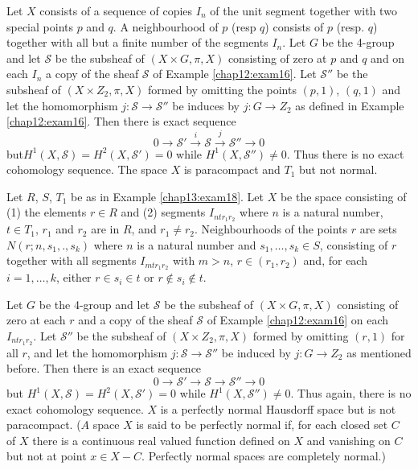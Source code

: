 \begin{exam}%
Let $X$ consists of a sequence of copies $I_n$ of the unit segment
together with two special points $p$ and $q$. A neighbourhood of
$p$ (resp $q$) consists of $p$ (resp. $q$) together with all but a
finite number of the segments $I_n$. Let $G$ be the 4-group and let
$\mathscr{S}$ be the subsheaf of $(X \times G, \pi, X)$ consisting  of
zero at $p$ and $q$ and on each $I_n$ a copy of the sheaf
$\mathscr{S}$ of Example \ref{chap12:exam16}. Let $\mathscr{S}''$ be
the subsheaf of 
$(X \times Z_2, \pi, X)$ formed by omitting the points $(p,1)$, $(q,1)$ and
let the homomorphism $j :  \mathscr{S} \to \mathscr{S}''$ be induces
by $j: G \to Z_2$ as defined in Example \ref{chap12:exam16}. Then
there is exact sequence 
$$
0 \to  \mathscr{S}' \xrightarrow{i} \mathscr{S} \xrightarrow{j} 
\mathscr{S}'' \to 0 
$$
but\pageoriginale $H^1(X, \mathscr{S}) = H^2(X,  \mathscr{S}')=0$ while $H^1(X,
\mathscr{S}'') \neq 0$. Thus there is no exact cohomology sequence. The 
space $X$ is paracompact and $T_1$ but not normal. 
\end{exam} 

\begin{exam}%
Let $R$, $S$, $T_1$ be as in Example \ref{chap13:exam18}. Let $X$ be
the space consisting 
of (1) the elements $r \in R$ and (2) segments $I_{n tr_1 r_2}$
where $n$ is a natural number, $t \in T_1$, $r_1$ and $r_2$ are in $R$,
and $r_1 \neq r_2$. Neighbourhoods of the points $r$ are
sets $N(r;n,s_1,., s_k)$ where $n$ is a natural number and $s_1, \ldots
, s_k \in S$, consisting of $r$ together  with all segments $I_{mtr_1
  r_2}$ with $m > n$, $r \in  (r_1, r_2)$ and, for each $i=1, \ldots
, k$, either $r \in  s_i \in t$ or $r \notin s_i \notin t$. 
\end{exam}

Let $G$ be the 4-group and let $\mathscr{S}$ be the subsheaf of $(X
\times G, \pi, X)$  consisting of zero at each $r$ and a copy  of the
sheaf $\mathscr{S}$ of Example \ref{chap12:exam16} on each $I_{ntr_1 r_2}$. Let
$\mathscr{S}''$ be the subsheaf of $(X \times Z_2,  \pi , X)$ formed
by omitting $(r,1)$ for all $r$, and let the homomorphism $j :
\mathscr{S} \to \mathscr{S}''$ be induced by $j :  G \to  Z_2$ as
mentioned before. Then there is an exact sequence 
$$
0 \to  \mathscr{S}' \to \mathscr{S} \to \mathscr{S}'' \to 0 
$$
but $H^1(X, \mathscr{S})= H^2(X, \mathscr{S}')=0$ while $H^1(X,
\mathscr{S}'') \neq 0$. Thus again, there is no exact cohomology
sequence. $X$  is a  perfectly normal Hausdorff space but is not
paracompact. ($A$ space $X$  is said to be perfectly normal if, for
each closed set $C$ of $X$ there is a continuous real valued function
defined on $X$ and vanishing on $C$ but not at point $x \in
X-C$. Perfectly normal spaces are completely normal.) 

